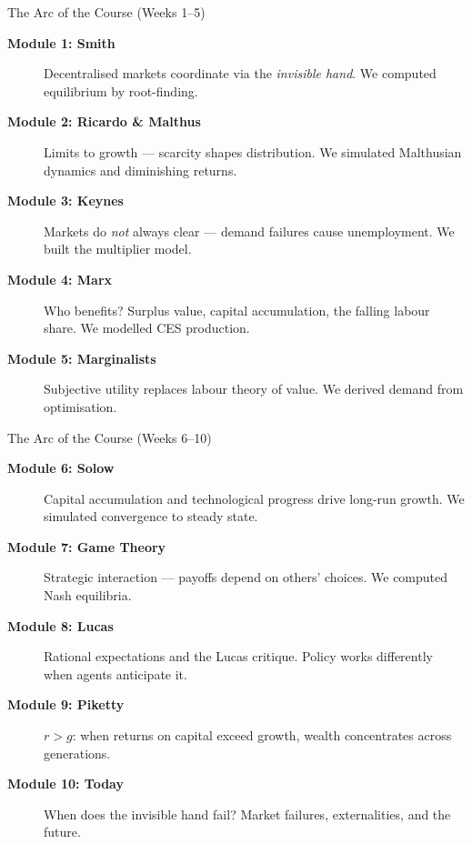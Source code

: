 \documentclass[aspectratio=169, 10pt]{beamer}
\begin{document}
\begin{frame}{The Arc of the Course (Weeks 1--5)}
\begin{description}
  \item[\textbf{Module 1: Smith}] Decentralised markets coordinate via the
        \textit{invisible hand}. We computed equilibrium by root-finding.
  \item[\textbf{Module 2: Ricardo \& Malthus}] Limits to growth --- scarcity
        shapes distribution. We simulated Malthusian dynamics and
        diminishing returns.
  \item[\textbf{Module 3: Keynes}] Markets do \textit{not} always clear ---
        demand failures cause unemployment. We built the multiplier model.
  \item[\textbf{Module 4: Marx}] Who benefits? Surplus value, capital
        accumulation, the falling labour share. We modelled CES production.
  \item[\textbf{Module 5: Marginalists}] Subjective utility replaces labour
        theory of value. We derived demand from optimisation.
\end{description}
\end{frame}

\begin{frame}{The Arc of the Course (Weeks 6--10)}
\begin{description}
  \item[\textbf{Module 6: Solow}] Capital accumulation and technological
        progress drive long-run growth. We simulated convergence to steady state.
  \item[\textbf{Module 7: Game Theory}] Strategic interaction --- payoffs
        depend on others' choices. We computed Nash equilibria.
  \item[\textbf{Module 8: Lucas}] Rational expectations and the Lucas critique.
        Policy works differently when agents anticipate it.
  \item[\textbf{Module 9: Piketty}] $r > g$: when returns on capital exceed
        growth, wealth concentrates across generations.
  \item[\textbf{Module 10: Today}] When does the invisible hand \alert{fail}?
        Market failures, externalities, and the future.
\end{description}
\end{frame}
\end{document}
